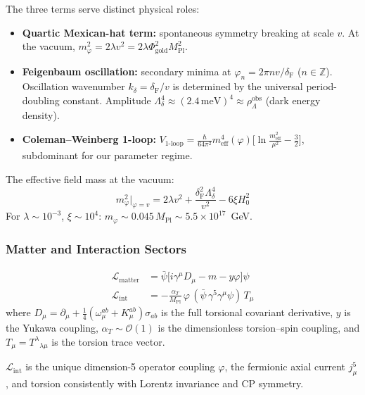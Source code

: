 \documentclass[12pt,a4paper]{article}
\newcommand{\MPl}{M_{\mathrm{Pl}}}
\newcommand{\Feig}{\delta_{\mathrm{F}}}
\newcommand{\alphaT}{\alpha_T}
\numberwithin{equation}{section}
\begin{document}
The three terms serve distinct physical roles:
\begin{itemize}[leftmargin=2em]
\item \textbf{Quartic Mexican-hat term:} spontaneous symmetry breaking at scale $v$.
  At the vacuum, $m_\varphi^2 = 2\lambda v^2 = 2\lambda\Phi_{\mathrm{gold}}^2\MPl^2$.
\item \textbf{Feigenbaum oscillation:} secondary minima at $\varphi_n = 2\pi nv/\Feig$
  ($n\in\mathbb{Z}$). Oscillation wavenumber $k_\delta = \Feig/v$ is determined
  by the universal period-doubling constant. Amplitude
  $\Lambda_\delta^4 \approx (2.4\,\mathrm{meV})^4 \approx \rho_\Lambda^{\mathrm{obs}}$
  (dark energy density).
\item \textbf{Coleman--Weinberg 1-loop:}
  $V_{\text{1-loop}} = \tfrac{\hbar}{64\pi^2}m_{\mathrm{eff}}^4(\varphi)\bigl[\ln\tfrac{m_{\mathrm{eff}}^2}{\mu^2} - \tfrac{3}{2}\bigr]$,
  subdominant for our parameter regime.
\end{itemize}

The effective field mass at the vacuum:
\begin{equation}
  m_\varphi^2\big|_{\varphi=v}
  = 2\lambda v^2 + \frac{\Feig^2\Lambda_\delta^4}{v^2} - 6\xi H_0^2
  \label{eq:phi_mass}
\end{equation}
For $\lambda\sim10^{-3}$, $\xi\sim10^4$: $m_\varphi \sim 0.045\,\MPl \sim 5.5\times10^{17}$~GeV.

\subsubsection{Matter and Interaction Sectors}

\begin{align}
  \mathcal{L}_{\mathrm{matter}} &= \bar\psi\bigl[i\gamma^\mu D_\mu - m - y\varphi\bigr]\psi
  \label{eq:matter_lag}\\
  \mathcal{L}_{\mathrm{int}} &= -\frac{\alphaT}{\MPl}\,\varphi\,
  (\bar\psi\,\gamma^5\gamma^\mu\psi)\,T_\mu
  \label{eq:int_lag}
\end{align}
where $D_\mu = \partial_\mu + \tfrac{1}{4}(\omega^{ab}_\mu + K^{ab}_\mu)\sigma_{ab}$
is the full torsional covariant derivative, $y$ is the Yukawa coupling,
$\alphaT \sim \mathcal{O}(1)$ is the dimensionless torsion--spin coupling,
and $T_\mu = T^\lambda{}_{\lambda\mu}$ is the torsion trace vector.

$\mathcal{L}_{\mathrm{int}}$ is the unique dimension-5 operator coupling $\varphi$,
the fermionic axial current $j^5_\mu$, and torsion consistently with
Lorentz invariance and CP symmetry.
\end{document}
